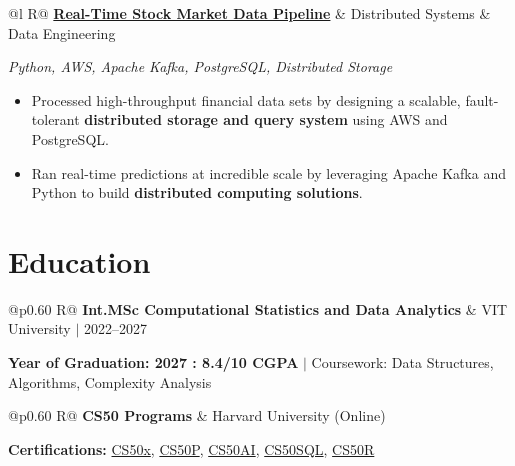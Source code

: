\documentclass[a4paper,10pt]{article}
\newcommand{\ulink}[2]{\href{#1}{#2}}
\newcommand{\subheading}[1]{{\color[HTML]{0A0A0A}\fontsize{12}{14}\selectfont\bfseries #1}}
\newcommand{\techstack}[1]{{\color[HTML]{5C5C5C}\fontsize{10.5}{12.5}\selectfont\itshape #1}}
\newcommand{\meta}[1]{{\color[HTML]{5C5C5C}\fontsize{10.5}{12.5}\selectfont #1}}
\begin{document}
\begin{tabularx}{\linewidth}{@{}l R@{}}
\subheading{\ulink{https://github.com/su-jin1425/Real-Time-Stock-Market-Data-Pipeline}{Real-Time Stock Market Data Pipeline}} & \meta{Distributed Systems \& Data Engineering}
\end{tabularx}
\techstack{Python, AWS, Apache Kafka, PostgreSQL, Distributed Storage}
\begin{itemize}[nosep, leftmargin=1.5em, itemsep=2pt, topsep=2pt]
  \item {\color[HTML]{0A0A0A}\fontsize{11}{14}\selectfont Processed high-throughput financial data sets by designing a scalable, fault-tolerant \textbf{distributed storage and query system} using AWS and PostgreSQL.}
  \item {\color[HTML]{0A0A0A}\fontsize{11}{14}\selectfont Ran real-time predictions at incredible scale by leveraging Apache Kafka and Python to build \textbf{distributed computing solutions}.}
\end{itemize}

\section{Education}
\vspace{2pt}

\begin{tabularx}{\linewidth}{@{}p{0.60\linewidth} R@{}}
\subheading{Int.MSc Computational Statistics and Data Analytics} & \meta{VIT University $|$ 2022--2027}
\end{tabularx}
{\color[HTML]{3A3A3A}\fontsize{11}{14}\selectfont \textbf{Year of Graduation: 2027 : 8.4/10 CGPA} $|$ Coursework: Data Structures, Algorithms, Complexity Analysis}

\begin{tabularx}{\linewidth}{@{}p{0.60\linewidth} R@{}}
\subheading{CS50 Programs} & \meta{Harvard University (Online)}
\end{tabularx}
{\color[HTML]{3A3A3A}\fontsize{11}{14}\selectfont \textbf{Certifications:} \ulink{https://cs50.harvard.edu/certificates/b14b78df-e05c-413e-a607-1dd27303053a}{CS50x}, \ulink{https://cs50.harvard.edu/certificates/32477052-9db4-49c4-a5a4-d7e58429ca2c}{CS50P}, \ulink{https://cs50.harvard.edu/certificates/9cdb4d4a-1250-4f8e-9fd7-191864e0f919}{CS50AI}, \ulink{https://cs50.harvard.edu/certificates/bc486f24-f085-4e61-8536-80940b97a1b9}{CS50SQL}, \ulink{https://cs50.harvard.edu/certificates/666838e6-a053-4d82-b179-a60fe745fd84}{CS50R}}
\end{document}
